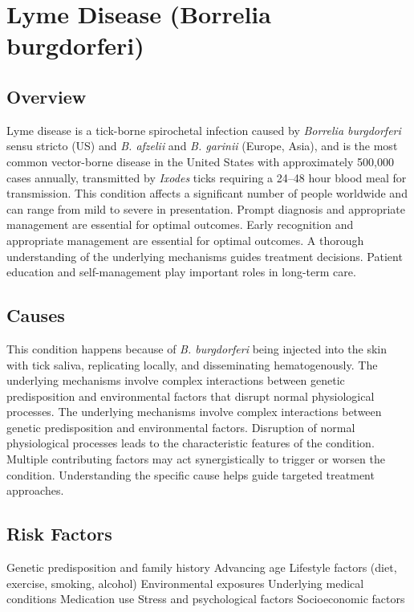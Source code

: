 \chapter{Lyme Disease (Borrelia burgdorferi)}
\label{sec:Lyme Disease}

\section{Overview}
Lyme disease is a tick-borne spirochetal infection caused by \textit{Borrelia burgdorferi} sensu stricto (US) and \textit{B. afzelii} and \textit{B. garinii} (Europe, Asia), and is the most common vector-borne disease in the United States with approximately 500,000 cases annually, transmitted by \textit{Ixodes} ticks requiring a 24--48 hour blood meal for transmission. This condition affects a significant number of people worldwide and can range from mild to severe in presentation. Prompt diagnosis and appropriate management are essential for optimal outcomes. Early recognition and appropriate management are essential for optimal outcomes. A thorough understanding of the underlying mechanisms guides treatment decisions. Patient education and self-management play important roles in long-term care.
\section{Causes}
This condition happens because of \textit{B. burgdorferi} being injected into the skin with tick saliva, replicating locally, and disseminating hematogenously. The underlying mechanisms involve complex interactions between genetic predisposition and environmental factors that disrupt normal physiological processes. The underlying mechanisms involve complex interactions between genetic predisposition and environmental factors. Disruption of normal physiological processes leads to the characteristic features of the condition. Multiple contributing factors may act synergistically to trigger or worsen the condition. Understanding the specific cause helps guide targeted treatment approaches.
\section{Risk Factors}
Genetic predisposition and family history Advancing age Lifestyle factors (diet, exercise, smoking, alcohol) Environmental exposures Underlying medical conditions Medication use Stress and psychological factors Socioeconomic factors


